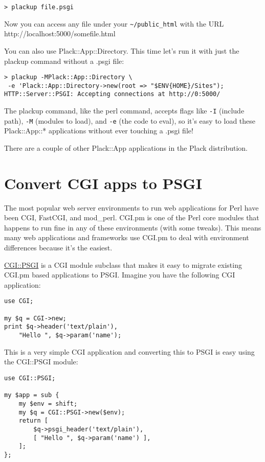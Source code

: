 \begin{lstlisting}
> plackup file.psgi
\end{lstlisting}

Now you can access any file under your \lstinline!~/public_html! with
the URL http://localhost:5000/somefile.html

You can also use Plack::App::Directory. This time let's run it with just
the plackup command without a .psgi file:

\begin{lstlisting}
> plackup -MPlack::App::Directory \
 -e 'Plack::App::Directory->new(root => "$ENV{HOME}/Sites");
HTTP::Server::PSGI: Accepting connections at http://0:5000/
\end{lstlisting}

The plackup command, like the perl command, accepts flags like
\lstinline!-I! (include path), \lstinline!-M! (modules to load), and
\lstinline!-e! (the code to eval), so it's easy to load these
Plack::App::* applications without ever touching a .psgi file!

There are a couple of other Plack::App applications in the Plack
distribution.

\chapter{Convert CGI apps to
PSGI}\label{day-6-convert-cgi-apps-to-psgi}

The most popular web server environments to run web applications for
Perl have been CGI, FastCGI, and mod\_perl. CGI.pm is one of the Perl
core modules that happens to run fine in any of these environments (with
some tweaks). This means many web applications and frameworks use CGI.pm
to deal with environment differences because it's the easiest.

\href{http://search.cpan.org/perldoc?CGI::PSGI}{CGI::PSGI} is a CGI
module subclass that makes it easy to migrate existing CGI.pm based
applications to PSGI. Imagine you have the following CGI application:

\begin{lstlisting}
use CGI;

my $q = CGI->new;
print $q->header('text/plain'),
    "Hello ", $q->param('name');
\end{lstlisting}

This is a very simple CGI application and converting this to PSGI is
easy using the CGI::PSGI module:

\begin{lstlisting}
use CGI::PSGI;

my $app = sub {
    my $env = shift;
    my $q = CGI::PSGI->new($env);
    return [
        $q->psgi_header('text/plain'),
        [ "Hello ", $q->param('name') ],
    ];
};
\end{lstlisting}

